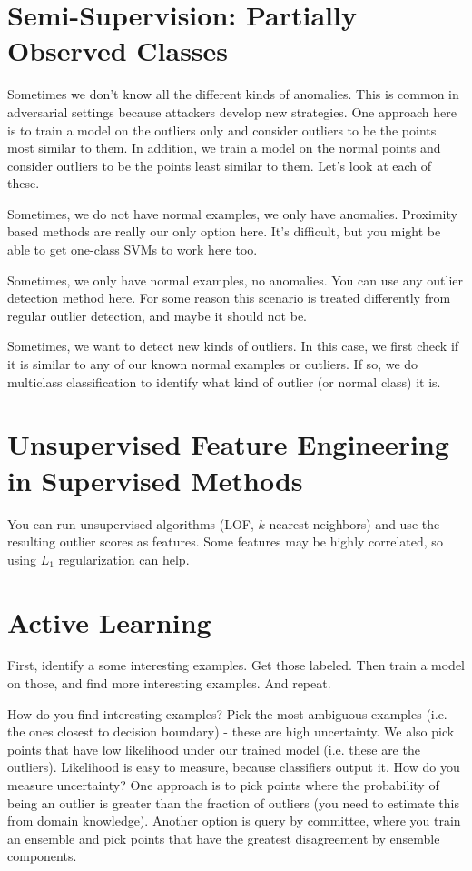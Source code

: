 \documentclass[a4paper]{article}
\begin{document}
\section{Semi-Supervision: Partially Observed Classes}
Sometimes we don't know all the different kinds of anomalies. This is common
in adversarial settings because attackers develop new strategies. One approach
here is to train a model on the outliers only and consider outliers to be the
points most similar to them. In addition, we train a model on the normal
points and consider outliers to be the points least similar to them. Let's
look at each of these.

Sometimes, we do not have normal examples, we only have anomalies. Proximity
based methods are really our only option here. It's difficult, but you might
be able to get one-class SVMs to work here too.

Sometimes, we only have normal examples, no anomalies. You can use any outlier
detection method here. For some reason this scenario is treated differently
from regular outlier detection, and maybe it should not be.

Sometimes, we want to detect new kinds of outliers. In this case, we first
check if it is similar to any of our known normal examples or outliers. If so,
we do multiclass classification to identify what kind of outlier (or normal
class) it is.

\section{Unsupervised Feature Engineering in Supervised Methods}
You can run unsupervised algorithms (LOF, $k$-nearest neighbors)
and use the resulting outlier scores as features. Some features may be
highly correlated, so using $L_1$ regularization can help.

\section{Active Learning}
First, identify a some interesting examples. Get those labeled. Then train a
model on those, and find more interesting examples. And repeat.

How do you find interesting examples? Pick the most ambiguous examples (i.e.
the ones closest to decision boundary) - these are high uncertainty. We also
pick points that have low likelihood under our trained model (i.e. these
are the outliers). Likelihood is easy to measure, because classifiers output
it. How do you measure uncertainty? One approach is to pick points where the
probability of being an outlier is greater than the fraction of outliers
(you need to estimate this from domain knowledge). Another option is
query by committee, where you train an ensemble and pick points that have the
greatest disagreement by ensemble components.
\end{document}
